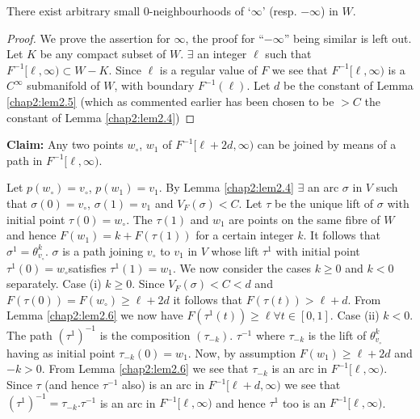 \setcounter{prop}{6}
\begin{prop}\label{chap2:prop2.7}%
 There exist arbitrary small 0-neighbourhoods of `$\infty$'
  (resp. $-\infty$) in $W$. 
\end{prop}

\begin{proof}
We prove the assertion for $ \infty$, the proof for ``$-\infty$''
being similar is left out. Let $K$ be any compact subset of
$W$. $\exists$ an integer $\ell$ such that $F^{-1} [\ell, \infty)
  \subset W - K$. Since $\ell$ is a regular value of $F$ we see that
  $F^{-1} [\ell, \infty)$ is a $C^ \infty$ submanifold of $W$, with
    boundary $F^{-1}(\ell)$. Let $d$ be the constant of Lemma \ref{chap2:lem2.5}
    (which as commented earlier has been chosen to be  $> C$ the
    constant of Lemma \ref{chap2:lem2.4})  
\end{proof}

\noindent
\textbf{Claim:} Any two points $w_\circ$, $w_1$ of $F^{-1} [\ell + 2d,
  \infty)$ can be joined by means of a path in $F^{-1} [\ell ,
    \infty)$. 

Let $p(w_\circ) = v_\circ$, $p (w_1) = v_1$. By Lemma
\ref{chap2:lem2.4} $\exists$ an arc 
$\sigma$ in $V$ such that $\sigma (0) = v_\circ$, $\sigma (1) = v_{1}$ and
$V_F (\sigma) < C$.  Let $\tau$ be the unique lift of $\sigma$ with
initial point $\tau(0) = w_\circ$. The $\tau (1)$ and $w_{1}$ are points
on the same fibre of $W$ and hence $F (w_1) = k + F(\tau (1))$ for a
certain integer $k$. It follows that $\sigma^{1} =
\theta^k_{v_\circ}$. $\sigma$ is a path joining $v_\circ$ to $v_1$ in
$V$ whose lift $\tau^1$ with initial point $\tau^{1} (0) =
w_\circ$\pageoriginale satisfies $\tau^1 
(1) = w_1$. We now consider the cases $k\geq 0$ and $k < 0$
separately. Case (i) $k\geq 0$. Since $V_F (\sigma ) < C < d $ and
$F(\tau (0)) = F(w_\circ) \geq \ell + 2d$ it follows that $F(\tau (t)) >
\ell + d$. From Lemma \ref{chap2:lem2.6} we now have $F (\tau^1 (t))
\geq \ell \forall t 
\in [0, 1]$. Case (ii) $k < 0$. The path $(\tau^1)^{-1}$ is the
composition $(\tau_{-k})$. $ \tau^{-1}$ where $\tau_{-k}$ is the lift
of $ \theta^{k}_{v_\circ}$ having as initial point $\tau_{-k}(0) =
w_{1}$. Now, by assumption $F(w_1)\geq \ell + 2d$ and $-k > 0$. From
Lemma \ref{chap2:lem2.6} we see that $\tau_{-k}$ is an arc in $F^{-1} [\ell,
  \infty)$. Since $\tau$ (and hence $\tau^{-1}$ also) is an arc in
  $F^{-1}[\ell + d, \infty)$  we see that $(\tau^1)^{-1} =
    \tau_{-k}.\tau ^{-1}$ is an arc in $F^{-1}[\ell, \infty)$ and
      hence $\tau^1$ too is an $F^{-1}[\ell, \infty)$. 

